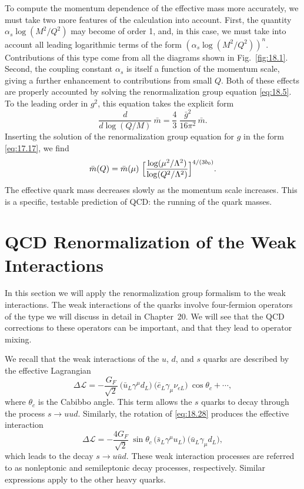 To compute the momentum dependence of the effective mass more accurately,
we must take two more features of the calculation into account.  First, the
quantity $\alpha_s\log(M^2/Q^2)$ may become of order 1, and, in this case,
we must take into account all leading logarithmic terms of the form
$(\alpha_s\log(M^2/Q^2))^n$.  Contributions of this type come from all the
diagrams shown in Fig.~\ref{fig:18.1}.  Second, the coupling constant
$\alpha_s$ is itself a function of the momentum scale, giving a further
enhancement to contributions from small $Q$.  Both of these effects are
properly accounted by solving the renormalization group equation
\eqref{eq:18.5}.  To the leading order in $g^2$, this equation takes the
explicit form
\begin{equation}
  \frac{d}{d\log(Q/M)}\ \bar{m} = \frac{4}{3}\ \frac{\bar{g}^2}{16\pi^2}\,
    \bar{m} .
  \label{eq:18.19}
\end{equation}
Inserting the solution of the renormalization group equation for $g$ in the
form \eqref{eq:17.17}, we find
\begin{equation}
  \bar{m}(Q) = \bar{m}(\mu)\ \Bigl[ \frac{\log(\mu^2/\Lambda^2)}
    {\log(Q^2/\Lambda^2)} \Bigr]^{4/(3b_0)} .
  \label{eq:18.20}
\end{equation}
The effective quark mass decreases slowly as the momentum scale increases.
This is a specific, testable prediction of QCD: the running of the quark
masses.

\section{QCD Renormalization of the Weak Interactions}

In this section we will apply the renormalization group formalism to the weak
interactions.  The weak interactions of the quarks involve four-fermion
operators of the type we will discuss in detail in Chapter~20.  We will see
that the QCD corrections to these operators can be important, and that they
lead to operator mixing.

We recall that the weak interactions of the $u$, $d$, and $s$ quarks are
described by the effective Lagrangian
\begin{equation}
  \Delta\mathcal{L} = -\frac{G_F}{\sqrt{2}}\ \bigl( \bar{u}_L\gamma^\mu d_L
    \bigr)\ \bigl( \bar{e}_L\gamma_\mu\nu_{eL} \bigr)\ \cos\theta_c
    + \cdots ,
  \label{eq:18.28}
\end{equation}
where $\theta_c$ is the Cabibbo angle.  This term allows the $s$ quarks to
decay through the process $s\to uud$.  Similarly, the rotation of
\eqref{eq:18.28} produces the effective interaction
\begin{equation}
  \Delta\mathcal{L} = -\frac{4G_F}{\sqrt{2}}\ \sin\theta_c\,
    \bigl( \bar{s}_L\gamma^\mu u_L \bigr)\ \bigl( \bar{u}_L\gamma_\mu d_L
      \bigr) ,
  \label{eq:18.32}
\end{equation}
which leads to the decay $s\to u\bar{u}d$.  These weak interaction processes
are referred to as nonleptonic and semileptonic decay processes,
respectively.  Similar expressions apply to the other heavy quarks.

